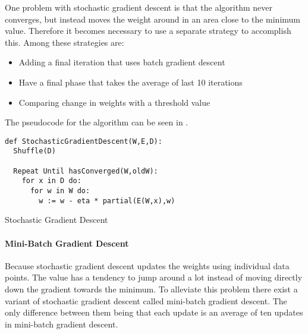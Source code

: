 One problem with stochastic gradient descent is that the algorithm never converges, but instead moves the weight around in an area close to the minimum value.
Therefore it becomes necessary to use a separate strategy to accomplish this.
Among these strategies are:
\begin{itemize}
\item Adding a final iteration that uses batch gradient descent 
\item Have a final phase that takes the average of last 10 iterations 
\item Comparing change in weights with a threshold value
\end{itemize}
The pseudocode for the algorithm can be seen in .
\begin{listing}[H]
\begin{verbatim}
def StochasticGradientDescent(W,E,D):
  Shuffle(D)

  Repeat Until hasConverged(W,oldW):
    for x in D do:
      for w in W do: 
        w := w - eta * partial(E(W,x),w)
\end{verbatim}
\caption{Stochastic Gradient Descent}
\label{lst:sgt}
\end{listing}

\paragraph{Mini-Batch Gradient Descent}\label{sec:mini-batch}
Because stochastic gradient descent updates the weights using individual data points.
The value has a tendency to jump around a lot instead of moving directly down the gradient towards the minimum.
To alleviate this problem there exist a variant of stochastic gradient descent called mini-batch gradient descent. 
The only difference between them being that each update is an average of ten updates in mini-batch gradient descent. 







